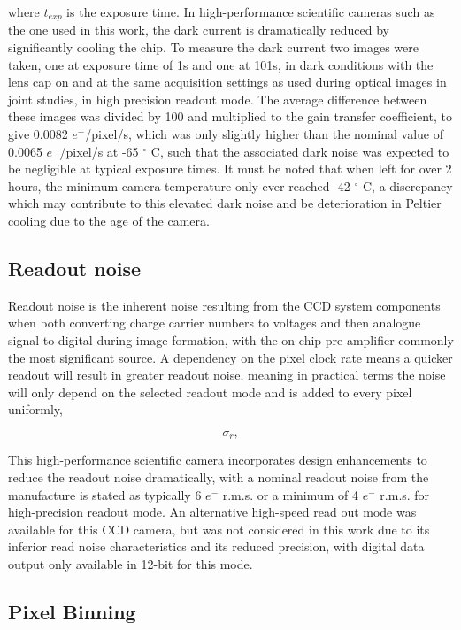 \documentclass[twoside]{bhamthesis}
\theoremstyle{definition}
\begin{document}
where $t_{exp}$ is the exposure time. In high-performance scientific cameras such as the one used in this work, the dark current is dramatically reduced by significantly cooling the chip. To measure the dark current two images were taken, one at exposure time of 1s and one at 101s, in dark conditions with the lens cap on and at the same acquisition settings as used during optical images in joint studies, in high precision readout mode. The average difference between these images was divided by 100 and multiplied to the gain transfer coefficient, to give 0.0082 $e^-$/pixel/s, which was only slightly higher than the nominal value of 0.0065 $e^-$/pixel/s at -65 $^\circ$ C, such that the associated dark noise was expected to be negligible at typical exposure times. It must be noted that when left for over 2 hours, the minimum camera temperature only ever reached -42 $^\circ$ C, a discrepancy which may contribute to this elevated dark noise and be deterioration in Peltier cooling due to the age of the camera.

\subsection{Readout noise}

Readout noise is the inherent noise resulting from the CCD system components when both converting charge carrier numbers to voltages and then analogue signal to digital during image formation, with the on-chip pre-amplifier commonly the most significant source. A dependency on the pixel clock rate means a quicker readout will result in greater readout noise, meaning in practical terms the noise will only depend on the selected readout mode and is added to every pixel uniformly, 

\begin{equation}
{ \sigma_r } ,
  \label{eqn:dark_noise}
\end{equation}

This high-performance scientific camera incorporates design enhancements to reduce the readout noise dramatically, with a nominal readout noise from the manufacture is stated as typically 6 $e^-$ r.m.s. or a minimum of 4 $e^-$ r.m.s. for high-precision readout mode. An alternative high-speed read out mode was available for this CCD camera, but was not considered in this work due to its inferior read noise characteristics and its reduced precision, with digital data output only available in 12-bit for this mode.

\subsection{Pixel Binning}
\label{appendix:Pixel_binning}
\end{document}
